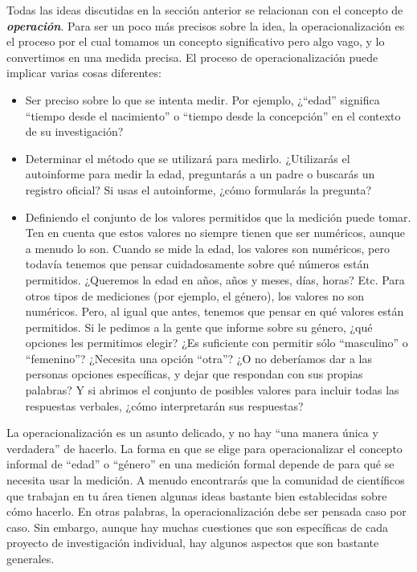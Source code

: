 \documentclass[]{book}
\providecommand{\tightlist}{%
  \setlength{\itemsep}{0pt}\setlength{\parskip}{0pt}}
\begin{document}
Todas las ideas discutidas en la sección anterior se relacionan con el concepto de \textbf{\emph{operación}}. Para ser un poco más precisos sobre la idea, la operacionalización es el proceso por el cual tomamos un concepto significativo pero algo vago, y lo convertimos en una medida precisa. El proceso de operacionalización puede implicar varias cosas diferentes:

\begin{itemize}
\tightlist
\item
  Ser preciso sobre lo que se intenta medir. Por ejemplo, ¿``edad'' significa ``tiempo desde el nacimiento'' o ``tiempo desde la concepción'' en el contexto de su investigación?
\item
  Determinar el método que se utilizará para medirlo. ¿Utilizarás el autoinforme para medir la edad, preguntarás a un padre o buscarás un registro oficial? Si usas el autoinforme, ¿cómo formularás la pregunta?
\item
  Definiendo el conjunto de los valores permitidos que la medición puede tomar. Ten en cuenta que estos valores no siempre tienen que ser numéricos, aunque a menudo lo son. Cuando se mide la edad, los valores son numéricos, pero todavía tenemos que pensar cuidadosamente sobre qué números están permitidos. ¿Queremos la edad en años, años y meses, días, horas? Etc. Para otros tipos de mediciones (por ejemplo, el género), los valores no son numéricos. Pero, al igual que antes, tenemos que pensar en qué valores están permitidos. Si le pedimos a la gente que informe sobre su género, ¿qué opciones les permitimos elegir? ¿Es suficiente con permitir sólo ``masculino'' o ``femenino''? ¿Necesita una opción ``otra''? ¿O no deberíamos dar a las personas opciones específicas, y dejar que respondan con sus propias palabras? Y si abrimos el conjunto de posibles valores para incluir todas las respuestas verbales, ¿cómo interpretarán sus respuestas?
\end{itemize}

La operacionalización es un asunto delicado, y no hay ``una manera única y verdadera'' de hacerlo. La forma en que se elige para operacionalizar el concepto informal de ``edad'' o ``género'' en una medición formal depende de para qué se necesita usar la medición. A menudo encontrarás que la comunidad de científicos que trabajan en tu área tienen algunas ideas bastante bien establecidas sobre cómo hacerlo. En otras palabras, la operacionalización debe ser pensada caso por caso. Sin embargo, aunque hay muchas cuestiones que son específicas de cada proyecto de investigación individual, hay algunos aspectos que son bastante generales.
\end{document}
